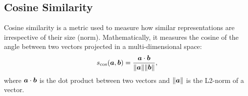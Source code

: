 \subsection{Cosine Similarity}

Cosine similarity is a metric used to measure how similar
representations are irrespective of their size (norm). Mathematically,
it measures the cosine of the angle between two vectors projected in a
multi-dimensional space:
\begin{equation}
  s_{\cos}(\bm{a}, \bm{b}) = \frac{\bm{a} \cdot \bm{b}}{\| \bm{a} \| \| \bm{b} \|},
\end{equation}
where $\bm{a} \cdot \bm{b}$ is the dot product between two vectors and
$\| \bm{a} \|$ is the L2-norm of a vector.
